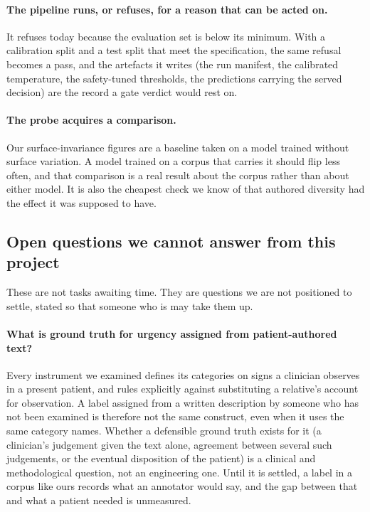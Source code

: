 \paragraph{The pipeline runs, or refuses, for a reason that can be acted on.} It
refuses today because the evaluation set is below its minimum. With a calibration
split and a test split that meet the specification, the same refusal becomes a
pass, and the artefacts it writes (the run manifest, the calibrated
temperature, the safety-tuned thresholds, the predictions carrying the served
decision) are the record a gate verdict would rest on.

\paragraph{The probe acquires a comparison.} Our surface-invariance figures are a
baseline taken on a model trained without surface variation. A model trained on a
corpus that carries it should flip less often, and that comparison is a real
result about the corpus rather than about either model. It is also the cheapest
check we know of that authored diversity had the effect it was supposed to have.

\subsection{Open questions we cannot answer from this project}

These are not tasks awaiting time. They are questions we are not positioned to
settle, stated so that someone who is may take them up.

\paragraph{What is ground truth for urgency assigned from patient-authored
text?} Every instrument we examined defines its categories on signs a clinician
observes in a present patient, and rules explicitly against substituting a
relative's account for observation. A label assigned from a written description
by someone who has not been examined is therefore not the same construct, even
when it uses the same category names. Whether a defensible ground truth exists
for it (a clinician's judgement given the text alone, agreement between
several such judgements, or the eventual disposition of the patient) is a
clinical and methodological question, not an engineering one. Until it is
settled, a label in a corpus like ours records what an annotator would say, and
the gap between that and what a patient needed is unmeasured.

